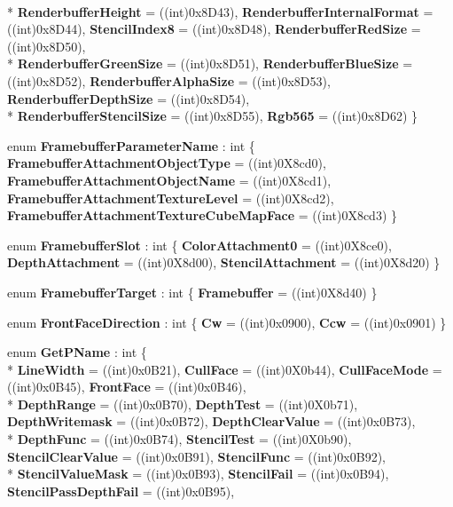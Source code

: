 \begin{DoxyCompactItemize}
\\*
{\bfseries Renderbuffer\-Height} = ((int)0x8\-D43), 
{\bfseries Renderbuffer\-Internal\-Format} = ((int)0x8\-D44), 
{\bfseries Stencil\-Index8} = ((int)0x8\-D48), 
{\bfseries Renderbuffer\-Red\-Size} = ((int)0x8\-D50), 
\\*
{\bfseries Renderbuffer\-Green\-Size} = ((int)0x8\-D51), 
{\bfseries Renderbuffer\-Blue\-Size} = ((int)0x8\-D52), 
{\bfseries Renderbuffer\-Alpha\-Size} = ((int)0x8\-D53), 
{\bfseries Renderbuffer\-Depth\-Size} = ((int)0x8\-D54), 
\\*
{\bfseries Renderbuffer\-Stencil\-Size} = ((int)0x8\-D55), 
{\bfseries Rgb565} = ((int)0x8\-D62)
 \}
\item 
enum {\bfseries Framebuffer\-Parameter\-Name} \-: int \{ {\bfseries Framebuffer\-Attachment\-Object\-Type} = ((int)0\-X8cd0), 
{\bfseries Framebuffer\-Attachment\-Object\-Name} = ((int)0\-X8cd1), 
{\bfseries Framebuffer\-Attachment\-Texture\-Level} = ((int)0\-X8cd2), 
{\bfseries Framebuffer\-Attachment\-Texture\-Cube\-Map\-Face} = ((int)0\-X8cd3)
 \}
\item 
enum {\bfseries Framebuffer\-Slot} \-: int \{ {\bfseries Color\-Attachment0} = ((int)0\-X8ce0), 
{\bfseries Depth\-Attachment} = ((int)0\-X8d00), 
{\bfseries Stencil\-Attachment} = ((int)0\-X8d20)
 \}
\item 
enum {\bfseries Framebuffer\-Target} \-: int \{ {\bfseries Framebuffer} = ((int)0\-X8d40)
 \}
\item 
enum {\bfseries Front\-Face\-Direction} \-: int \{ {\bfseries Cw} = ((int)0x0900), 
{\bfseries Ccw} = ((int)0x0901)
 \}
\item 
enum {\bfseries Get\-P\-Name} \-: int \{ \\*
{\bfseries Line\-Width} = ((int)0x0\-B21), 
{\bfseries Cull\-Face} = ((int)0\-X0b44), 
{\bfseries Cull\-Face\-Mode} = ((int)0x0\-B45), 
{\bfseries Front\-Face} = ((int)0x0\-B46), 
\\*
{\bfseries Depth\-Range} = ((int)0x0\-B70), 
{\bfseries Depth\-Test} = ((int)0\-X0b71), 
{\bfseries Depth\-Writemask} = ((int)0x0\-B72), 
{\bfseries Depth\-Clear\-Value} = ((int)0x0\-B73), 
\\*
{\bfseries Depth\-Func} = ((int)0x0\-B74), 
{\bfseries Stencil\-Test} = ((int)0\-X0b90), 
{\bfseries Stencil\-Clear\-Value} = ((int)0x0\-B91), 
{\bfseries Stencil\-Func} = ((int)0x0\-B92), 
\\*
{\bfseries Stencil\-Value\-Mask} = ((int)0x0\-B93), 
{\bfseries Stencil\-Fail} = ((int)0x0\-B94), 
{\bfseries Stencil\-Pass\-Depth\-Fail} = ((int)0x0\-B95), 

\end{DoxyCompactItemize}

